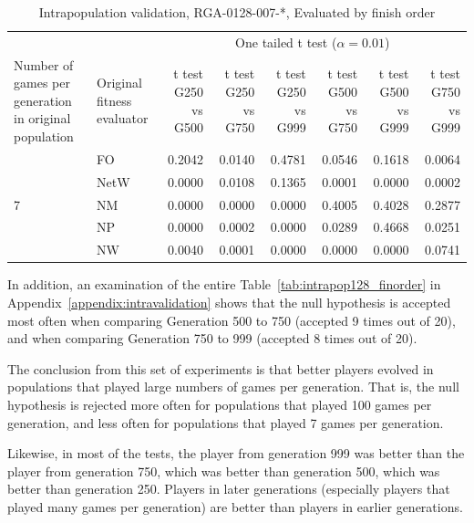 \begin{table}[htbp]
  \centering
  \caption{Intrapopulation validation, RGA-0128-007-*, Evaluated by finish order}
    \begin{tabularx}{\linewidth}{|p{1in}|p{1in}|r|r|r|r|r|r|}
    \cline{3-8}
    \multicolumn{1}{l}{} &  & \multicolumn{6}{c|}{One tailed t test (\(\alpha=0.01\))} \\
    \cline{1-8}
      Number of games per generation in original population
    & Original fitness evaluator
    & \multicolumn{1}{X|}{t test G250 vs G500} 
    & \multicolumn{1}{X|}{t test G250 vs G750} 
    & \multicolumn{1}{X|}{t test G250 vs G999} 
    & \multicolumn{1}{X|}{t test G500 vs G750} 
    & \multicolumn{1}{X|}{t test G500 vs G999} 
    & \multicolumn{1}{X|}{t test G750 vs G999} \\
    \cline{1-8}
    \multirow{5}{*}{7} 
      & FO & 0.2042 & 0.0140 & 0.4781 & 0.0546 & 0.1618 & 0.0064 \\
\cline{2-8}             
      & NetW & 0.0000 & 0.0108 & 0.1365 & 0.0001 & 0.0000 & 0.0002 \\
\cline{2-8}             
      & NM & 0.0000 & 0.0000 & 0.0000 & 0.4005 & 0.4028 & 0.2877 \\
\cline{2-8}             
      & NP & 0.0000 & 0.0002 & 0.0000 & 0.0289 & 0.4668 & 0.0251 \\
\cline{2-8}             
      & NW & 0.0040 & 0.0001 & 0.0000 & 0.0000 & 0.0000 & 0.0741 \\
    \cline{1-8}
    \end{tabularx}%
  \label{tab:validationRGA0128-007}%
\end{table}%

In addition, an examination of the entire Table~\ref{tab:intrapop128_finorder}
in Appendix~\ref{appendix:intravalidation} shows that the null hypothesis is
accepted most often when comparing Generation 500 to 750 (accepted 9 times out
of 20), and when comparing Generation 750 to 999 (accepted 8 times out of 20).

The conclusion from this set of experiments is that better players evolved in
populations that played large numbers of games per generation. That is, the null
hypothesis is rejected more often for populations that played 100 games per
generation, and less often for populations that played 7 games per generation.

Likewise, in most of the tests, the player from generation 999 was better than
the player from generation 750, which was better than generation 500, which was
better than generation 250. Players in later generations (especially players
that played many games per generation) are better than players in earlier
generations.

